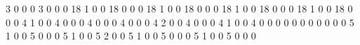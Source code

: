 3
0
0
0
3
0
0
0
18
1
0
0
18
0
0
0
18
1
0
0
18
0
0
0
18
1
0
0
18
0
0
0
18
1
0
0
18
0
0
0
4
1
0
0
4
0
0
0
4
0
0
0
4
0
0
0
4
2
0
0
4
0
0
0
4
1
0
0
4
0
0
0
0
0
0
0
0
0
0
0
5
1
0
0
5
0
0
0
5
1
0
0
5
2
0
0
5
1
0
0
5
0
0
0
5
1
0
0
5
0
0
0
